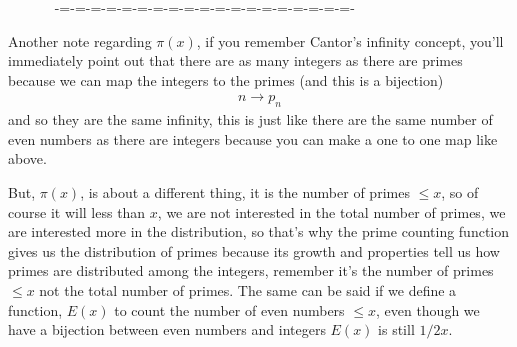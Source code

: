 \documentclass[aps,preprint,preprintnumbers,nofootinbib,showpacs,prd]{revtex4-1}
\newcommand{\nbea}{\begin{eqnarray*}}
\newcommand{\neea}{\end{eqnarray*}}
\begin{document}
~~~~~~ -=-=-=-=-=-=-=-=-=-=-=-=-=-=-=-=-=-=-=-


Another note regarding $\pi(x)$, if you remember Cantor's infinity concept, you'll immediately point out that there are as many integers as there are primes because we can map the integers to the primes (and this is a bijection)
%
\nbea
n \to p_n
\neea
%
and so they are the same infinity, this is just like there are the same number of even numbers as there are integers because you can make a one to one map like above.

But, $\pi(x)$, is about a different thing, it is the number of primes $\le x$, so of course it will less than $x$, we are not interested in the total number of primes, we are interested more in the distribution, so that's why the prime counting function gives us the distribution of primes because its growth and properties tell us how primes are distributed among the integers, remember it's the number of primes $\le x$ not the total number of primes. The same can be said if we define a function, $E(x)$ to count the number of even numbers $\le x$, even though we have a bijection between even numbers and integers $E(x)$ is still $1/2 x$.
\end{document}
